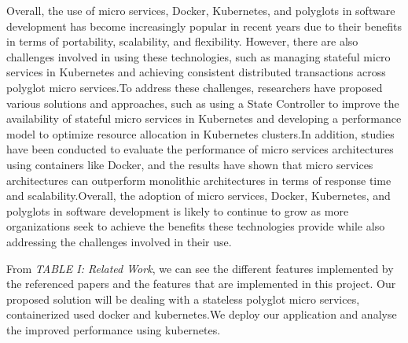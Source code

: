 Overall, the use of micro services, Docker, Kubernetes, and polyglots in software development has become increasingly popular in recent years due to their benefits in terms of portability, scalability, and flexibility. However, there are also challenges involved in using these technologies, such as managing stateful micro services in Kubernetes and achieving consistent distributed transactions across polyglot micro services.To address these challenges, researchers have proposed various solutions and approaches, such as using a State Controller to improve the availability of stateful micro services in Kubernetes and developing a performance model to optimize resource allocation in Kubernetes clusters.In addition, studies have been conducted to evaluate the performance of micro services architectures using containers like Docker, and the results have shown that micro services architectures can outperform monolithic architectures in terms of response time and scalability.Overall, the adoption of micro services, Docker, Kubernetes, and polyglots in software development is likely to continue to grow as more organizations seek to achieve the benefits these technologies provide while also addressing the challenges involved in their use.

From \emph{TABLE I: Related Work}, we can see the different features implemented by the referenced papers and the features that are implemented in this project.
Our proposed solution will be dealing with a stateless polyglot micro services, containerized used docker and kubernetes.We deploy our application and analyse the improved performance using kubernetes.

\begin{table}[h]
\caption{Related Work}
\end{table}
